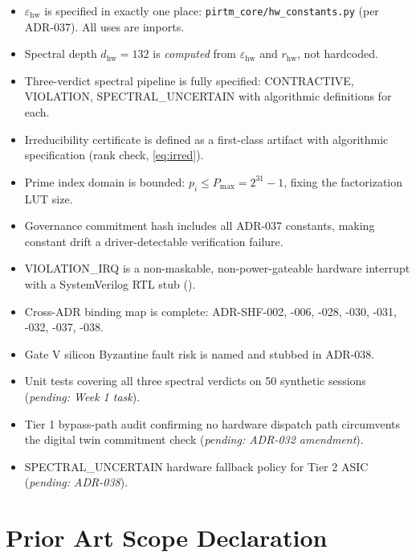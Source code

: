\documentclass[12pt,letterpaper]{article}
\theoremstyle{plain}
\theoremstyle{definition}
\theoremstyle{remark}
\begin{document}
\begin{itemize}[label=\(\boxtimes\)]
  \item \(\varepsilon_{\mathrm{hw}}\) is specified in exactly one place:
        \texttt{pirtm\_core/hw\_constants.py} (per ADR-037). All uses are imports.
  \item Spectral depth \(d_{\mathrm{hw}} = 132\) is \emph{computed} from
        \(\varepsilon_{\mathrm{hw}}\) and \(r_{\mathrm{hw}}\), not hardcoded.
  \item Three-verdict spectral pipeline is fully specified: CONTRACTIVE,
        VIOLATION, SPECTRAL\_UNCERTAIN with algorithmic definitions for each.
  \item Irreducibility certificate is defined as a first-class artifact with
        algorithmic specification (rank check, \cref{eq:irred}).
  \item Prime index domain is bounded: \(p_i \leq P_{\max} = 2^{31}-1\),
        fixing the factorization LUT size.
  \item Governance commitment hash includes all ADR-037 constants, making
        constant drift a driver-detectable verification failure.
  \item VIOLATION\_IRQ is a non-maskable, non-power-gateable hardware interrupt
        with a SystemVerilog RTL stub ().
  \item Cross-ADR binding map is complete: ADR-SHF-002, -006, -028, -030,
        -031, -032, -037, -038.
  \item Gate V silicon Byzantine fault risk is named and stubbed in ADR-038.
\end{itemize}

\begin{itemize}[label=\(\square\)]
  \item Unit tests covering all three spectral verdicts on 50 synthetic sessions
        (\textit{pending: Week 1 task}).
  \item Tier 1 bypass-path audit confirming no hardware dispatch path circumvents
        the digital twin commitment check (\textit{pending: ADR-032 amendment}).
  \item SPECTRAL\_UNCERTAIN hardware fallback policy for Tier 2 ASIC
        (\textit{pending: ADR-038}).
\end{itemize}

\section{Prior Art Scope Declaration}
\end{document}
